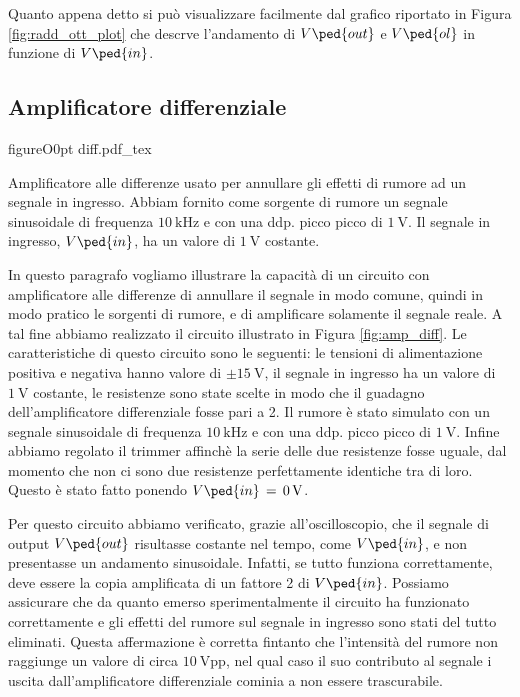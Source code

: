 Quanto appena detto si può visualizzare facilmente dal grafico riportato in Figura \ref{fig:radd_ott_plot} che descrve l'andamento di $V\ped{out}$ e $V\ped{ol}$ in funzione di $V\ped{in}$.

\subsection*{Amplificatore differenziale}

\begin{wrapfloat}{figure}{O}{0pt}
        \def\svgwidth{0.5\textwidth}
        {diff.pdf_tex}
        \caption{Amplificatore alle differenze usato per annullare gli effetti di rumore ad un segnale in ingresso. Abbiam fornito come sorgente di rumore un segnale sinusoidale di frequenza $\SI{10}{\kilo\hertz}$ e con una ddp. picco picco di $\SI{1}{\volt}$. Il segnale in ingresso, $V\ped{in}$, ha un valore di $\SI{1}{\volt}$ costante.}
        \label{fig:amp_diff}
\end{wrapfloat}

In questo paragrafo vogliamo illustrare la capacità di un circuito con amplificatore alle differenze di annullare il segnale in modo comune, quindi in modo pratico le sorgenti di rumore, e di amplificare solamente il segnale reale.
A tal fine abbiamo realizzato il circuito illustrato in Figura \ref{fig:amp_diff}. Le caratteristiche di questo circuito sono le seguenti: le tensioni di alimentazione positiva e negativa hanno valore di $\pm15\SI{}{\volt}$, il segnale in ingresso ha un valore di $\SI{1}{\volt}$ costante, le resistenze sono state scelte in modo che il guadagno dell'amplificatore differenziale fosse pari a 2. Il rumore è stato simulato con un segnale sinusoidale di frequenza $\SI{10}{\kilo\hertz}$ e con una ddp. picco picco di $\SI{1}{\volt}$.
Infine abbiamo regolato il trimmer affinchè la serie delle due resistenze fosse uguale, dal momento che non ci sono due resistenze perfettamente identiche tra di loro. Questo è stato fatto ponendo  $V\ped{in}\,=\,\SI{0}{\volt}$.

Per questo circuito abbiamo verificato, grazie all'oscilloscopio, che il segnale di output $V\ped{out}$ risultasse costante nel tempo, come $V\ped{in}$, e non presentasse un andamento sinusoidale. Infatti, se tutto funziona correttamente, deve essere la copia amplificata di un fattore 2 di $V\ped{in}$. Possiamo assicurare che da quanto emerso sperimentalmente il circuito ha funzionato correttamente e gli effetti del rumore sul segnale in ingresso sono stati del tutto eliminati. Questa affermazione è corretta fintanto che l'intensità del rumore non raggiunge un valore di circa $\SI{10}{\volt}$pp, nel qual caso il suo contributo al segnale i uscita dall'amplificatore differenziale cominia a non essere trascurabile.

